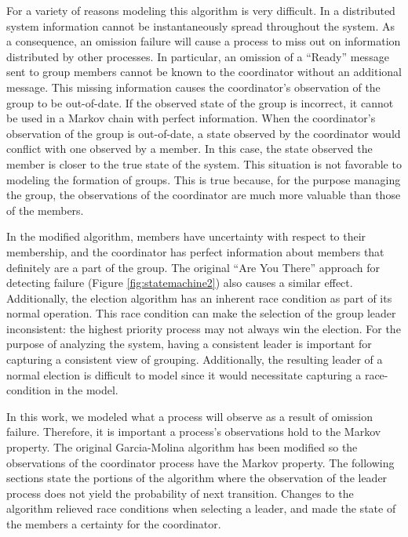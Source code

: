 For a variety of reasons modeling this algorithm is very difficult.
In a distributed system information cannot be instantaneously spread throughout the system.
As a consequence, an omission failure will cause a process to miss out on information distributed by other processes.
In particular, an omission of a ``Ready'' message sent to group members cannot be known to the coordinator without an additional message.
This missing information causes the coordinator's observation of the group to be out-of-date.
If the observed state of the group is incorrect, it cannot be used in a Markov chain with perfect information.
When the coordinator's observation of the group is out-of-date, a state observed by the coordinator would conflict with one observed by a member.
In this case, the state observed the member is closer to the true state of the system.
This situation is not favorable to modeling the formation of groups.
This is true because, for the purpose managing the group, the observations of the coordinator are much more valuable than those of the members.

In the modified algorithm, members have uncertainty with respect to their membership, and the coordinator has perfect information about members that definitely are a part of the group.
The original ``Are You There'' approach for detecting failure (Figure \ref{fig:statemachine2}) also causes a similar effect.
Additionally, the election algorithm has an inherent race condition as part of its normal operation.
This race condition can make the selection of the group leader inconsistent: the highest priority process may not always win the election.
For the purpose of analyzing the system, having a consistent leader is important for capturing a consistent view of grouping.
Additionally, the resulting leader of a normal election is difficult to model since it would necessitate capturing a race-condition in the model.

In this work, we modeled what a process will observe as a result of omission failure.
Therefore, it is important a process's observations hold to the Markov property.
The original Garcia-Molina algorithm has been modified so the observations of the coordinator process have the Markov property.
The following sections state the portions of the algorithm where the observation of the leader process does not yield the probability of next transition.
Changes to the algorithm relieved race conditions when selecting a leader, and made the state of the members a certainty for the coordinator.

